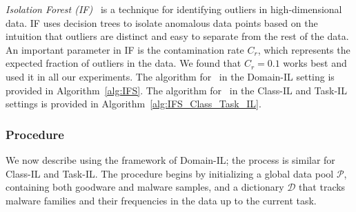 {\em Isolation Forest (IF)}~\cite{if} is a technique for identifying outliers in high-dimensional data. IF uses decision trees to isolate anomalous data points based on the intuition that outliers are distinct and easy to separate from the rest of the data. An important parameter in IF is the contamination rate $C_{r}$, which represents the expected fraction of outliers in the data. We found that $C_{r} = 0.1$ works best and used it in all our experiments. The algorithm for \system\ in the Domain-IL setting is provided in Algorithm~\ref{alg:IFS}. The algorithm for \system\ in the Class-IL and Task-IL settings is provided in Algorithm~\ref{alg:IFS_Class_Task_IL}. 









\subsubsection*{\bf Procedure}
We now describe \system using the framework of Domain-IL; the process is similar for Class-IL and Task-IL. 
The procedure begins by initializing a global data pool $\mathcal{P}$, containing both goodware and malware samples, and a dictionary $\mathcal{D}$ that tracks malware families and their frequencies in the data up to the current task.

